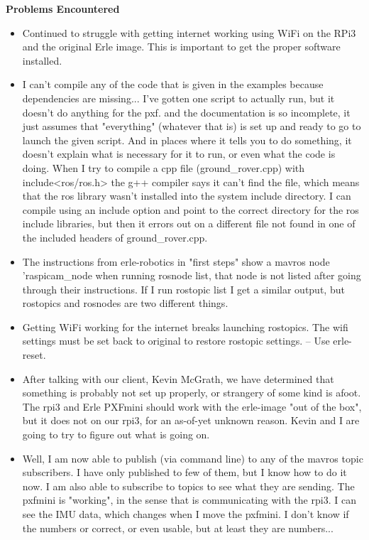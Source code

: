 \documentclass[compsoc,draftclsnofoot,onecolumn,10pt]{IEEEtran}
\begin{document}
\textbf{Problems Encountered}
\begin{itemize}
    \item Continued to struggle with getting internet working using WiFi on the RPi3 and the original Erle image. This is important to get the proper software installed.
    \item I can't compile any of the code that is given in the examples because dependencies are missing... I've gotten one script to actually run, but it doesn't do anything for the pxf. and the documentation is so incomplete, it just assumes that "everything" (whatever that is) is set up and ready to go to launch the given script. And in places where it tells you to do something, it doesn't explain what is necessary for it to run, or even what the code is doing. When I try to compile a cpp file (ground\_rover.cpp) with include<ros/ros.h> the g++ compiler says it can't find the file, which means that the ros library wasn't installed into the system include directory. I can compile using an include option and point to the correct directory for the ros include libraries, but then it errors out on a different file not found in one of the included headers of ground\_rover.cpp.
    \item The instructions from erle-robotics in "first steps" show a mavros node 'raspicam\_node when running rosnode list, that node is not listed after going through their instructions. If I run rostopic list I get a similar output, but rostopics and rosnodes are two different things.
    \item Getting WiFi working for the internet breaks launching rostopics. The wifi settings must be set back to original to restore rostopic settings. -- Use erle-reset.
    \item After talking with our client, Kevin McGrath, we have determined that something is probably not set up properly, or strangery of some kind is afoot. The rpi3 and Erle PXFmini should work with the erle-image "out of the box", but it does not on our rpi3, for an as-of-yet unknown reason. Kevin and I are going to try to figure out what is going on.
    \item Well, I am now able to publish (via command line) to any of the mavros topic subscribers. I have only published to few of them, but I know how to do it now. I am also able to subscribe to topics to see what they are sending. The pxfmini is "working", in the sense that is communicating with the rpi3. I can see the IMU data, which changes when I move the pxfmini. I don't know if the numbers or correct, or even usable, but at least they are numbers...

\end{itemize}
\end{document}
